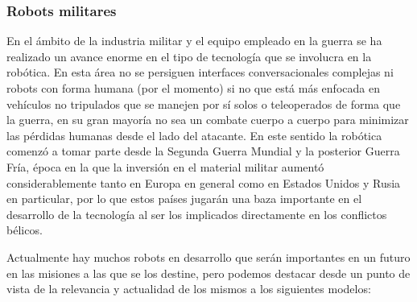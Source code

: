 \subsubsection{Robots militares}
En el ámbito de la industria militar y el equipo empleado en la guerra se ha realizado un avance enorme en el tipo de tecnología que se involucra en la robótica. En esta área no se persiguen interfaces conversacionales complejas ni robots con forma humana (por el momento) si no que está más enfocada en vehículos no tripulados que se manejen por sí solos o teleoperados de forma que la guerra, en su gran mayoría no sea un combate cuerpo a cuerpo para minimizar las pérdidas humanas desde el lado del atacante. En este sentido la robótica comenzó a tomar parte desde la Segunda Guerra Mundial y la posterior Guerra Fría, época en la que la inversión en el material militar aumentó considerablemente tanto en Europa en general como en Estados Unidos y Rusia en particular, por lo que estos países jugarán una baza importante en el desarrollo de la tecnología al ser los implicados directamente en los conflictos bélicos.

Actualmente hay muchos robots en desarrollo que serán importantes en un futuro en las misiones a las que se los destine, pero podemos destacar desde un punto de vista de la relevancia y actualidad de los mismos a los siguientes modelos:

